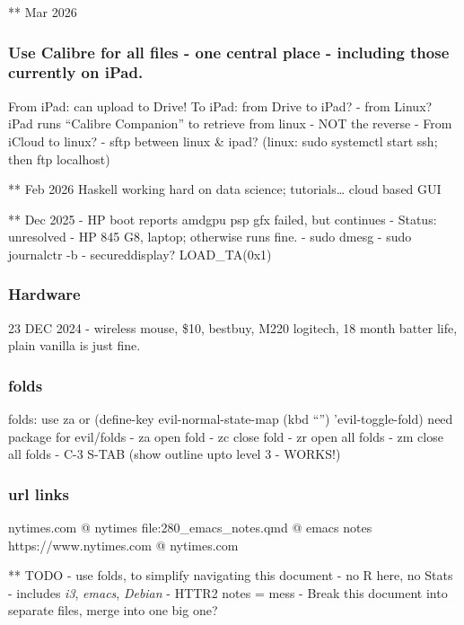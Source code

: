 \documentclass[
  letterpaper,
  DIV=11,
  numbers=noendperiod]{scrartcl}
\begin{document}
** Mar 2026

\subsubsection{Use Calibre for all files - one central place - including
those currently on
iPad.}\label{use-calibre-for-all-files---one-central-place---including-those-currently-on-ipad.}

From iPad: can upload to Drive! To iPad: from Drive to iPad? - from
Linux? iPad runs ``Calibre Companion'' to retrieve from linux - NOT the
reverse - From iCloud to linux? - sftp between linux \& ipad? (linux:
sudo systemctl start ssh; then ftp localhost)

** Feb 2026 Haskell working hard on data science; tutorials\ldots{}
cloud based GUI

** Dec 2025 - HP boot reports amdgpu psp gfx failed, but continues -
Status: unresolved - HP 845 G8, laptop; otherwise runs fine. - sudo
dmesg - sudo journalctr -b - secureddisplay? LOAD\_TA(0x1)

\subsubsection{Hardware}\label{hardware}

23 DEC 2024 - wireless mouse, \$10, bestbuy, M220 logitech, 18 month
batter life, plain vanilla is just fine.

\subsubsection{folds}\label{folds}

folds: use za or (define-key evil-normal-state-map (kbd ``'')
'evil-toggle-fold) need package for evil/folds - za open fold - zc close
fold - zr open all folds - zm close all folds - C-3 S-TAB (show outline
upto level 3 - WORKS!)

\subsubsection{url links}\label{url-links}

nytimes.com @ nytimes file:280\_emacs\_notes.qmd @ emacs notes
https://www.nytimes.com @ nytimes.com

** TODO - use folds, to simplify navigating this document - no R here,
no Stats - includes \emph{i3}, \emph{emacs}, \emph{Debian} - HTTR2 notes
= mess - Break this document into separate files, merge into one big
one?
\end{document}
